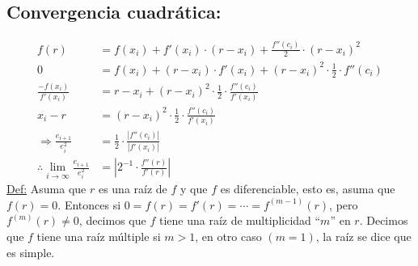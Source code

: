 \subsection{Convergencia cuadrática:}
\begin{equation*}
\begin{aligned}
f(r) &= f(x_i) + f'(x_i) \cdot (r- x_i) + \frac{f''(c_i)}{2} \cdot (r - x_i)^2 \\
0 &= f(x_i) + (r - x_i) \cdot f'(x_i) + (r - x_i)^2 \cdot \frac{1}{2} \cdot f''(c_i) \\
\frac{-f(x_i)}{f'(x_i)} &= r - x_i + (r - x_i)^2 \cdot \frac{1}{2} \cdot \frac{f''(c_i)}{f'(x_i)}\\
x_i - r &= (r - x_i)^2 \cdot \frac{1}{2} \cdot \frac{f''(c_i)}{f'(x_i)} \\
\Rightarrow \frac{e_{i+1}}{e_{i}^2} &= \frac{1}{2} \cdot \frac{|f''(c_i)|}{|f'(x_i)|} \\
\therefore \lim_{i \to \infty} \frac{e_{i+1}}{e_{i}^2} &= \left| 2^{-1} \cdot \frac{f''(r)}{f'(r)}\right|
\end{aligned}
\end{equation*}
\underline{Def:} Asuma que \(r\) es una raíz de \(f\) y que \(f\) es diferenciable, esto es, asuma que \(f(r) = 0\). Entonces si \(0 = f(r) = f'(r) = \cdots = f^{(m-1)}(r)\), pero \(f^{(m)}(r) \neq 0\), decimos que \(f\) tiene una raíz de multiplicidad ``\(m\)'' en \(r\). Decimos que \(f\) tiene una raíz múltiple si \(m > 1\), en otro caso \((m = 1)\),  la raíz se dice que es simple.\\

